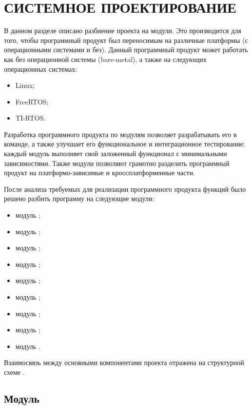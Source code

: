 \section{СИСТЕМНОЕ ПРОЕКТИРОВАНИЕ}
\label{sec:sys}

В данном разделе описано разбиение проекта на модули. Это производится для того, чтобы программный продукт был переносимым на различные платформы (с операционными системами и без). 
Данный программный продукт может работать как без операционной системы (bare-metal), а также на следующих операционных системах: 
\begin{itemize}
    \item Linux;
    \item FreeRTOS;
    \item TI-RTOS.
\end{itemize}

Разработка программного продукта по модулям позволяет разрабатывать его в команде, а также улучшает его функциональное и интеграционное тестирование: 
каждый модуль выполняет свой заложенный функционал с минимальными зависимостями.
Также модули позволяют грамотно разделить программный продукт на платформо-зависимые и кроссплатформенные части. 

После анализа требуемых для реализации программного продукта функций было решено разбить программу на следующие модули:

\begin{itemize}
    \item модуль \modulePerifery;
    \item модуль \moduleCalib;
    \item модуль \moduleCalibControl;
    \item модуль \moduleUart;
    \item модуль \moduleMoveDetect;
    \item модуль \moduleOrientationAzimuth;
    \item модуль \moduleFindTarget;
    \item модуль \moduleFlashMemory;
    \item модуль \moduleGraphics.
\end{itemize}

Взаимосвязь между основными компонентами проекта отражена на структурной схеме
\structScheme.

\subsection{Модуль \modulePerifery}

